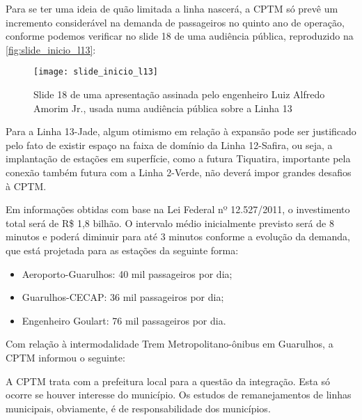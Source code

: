 \documentclass[11pt,fleqn]{book} %
\begin{document}
Para se ter uma ideia de quão limitada a linha nascerá, a CPTM só prevê um incremento considerável na demanda de passageiros no quinto ano de operação, conforme podemos verificar no slide 18 de uma audiência pública, reproduzido na \autoref{fig:slide_inicio_l13}:

\begin{landscape}
\begin{figure}[h]
	\centering
	\caption[Slide de apresentação sobre a Linha 13-Jade]{Slide 18 de uma apresentação assinada pelo engenheiro Luiz Alfredo Amorim Jr., usada numa audiência pública sobre a Linha 13}
	\texttt{[image: slide\_inicio\_l13]}
	\label{fig:slide_inicio_l13}
\end{figure}
\end{landscape}


Para a Linha 13-Jade, algum otimismo em relação à expansão pode ser justificado pelo fato de existir espaço na faixa de domínio da Linha 12-Safira, ou seja, a implantação de estações em superfície, como a futura Tiquatira, importante pela conexão também futura com a Linha 2-Verde, não deverá impor grandes desafios à CPTM.

Em informações obtidas com base na Lei Federal nº 12.527/2011, o investimento total será de R\$ 1,8 bilhão. O intervalo médio inicialmente previsto será de 8 minutos e poderá diminuir para até 3 minutos conforme a evolução da demanda, que está projetada para as estações da seguinte forma:

\begin{itemize}
	\item Aeroporto-Guarulhos: 40 mil passageiros por dia;
	\item Guarulhos-CECAP: 36 mil passageiros por dia;
	\item Engenheiro Goulart: 76 mil passageiros por dia.
\end{itemize}

Com relação à intermodalidade Trem Metropolitano-ônibus em Guarulhos, a CPTM informou o seguinte:

\begin{citacao}
	A CPTM trata com a prefeitura local para a questão da integração. Esta só ocorre se houver interesse do município. Os estudos de remanejamentos de linhas municipais, obviamente, é de responsabilidade dos municípios.
\end{citacao}
\end{document}

